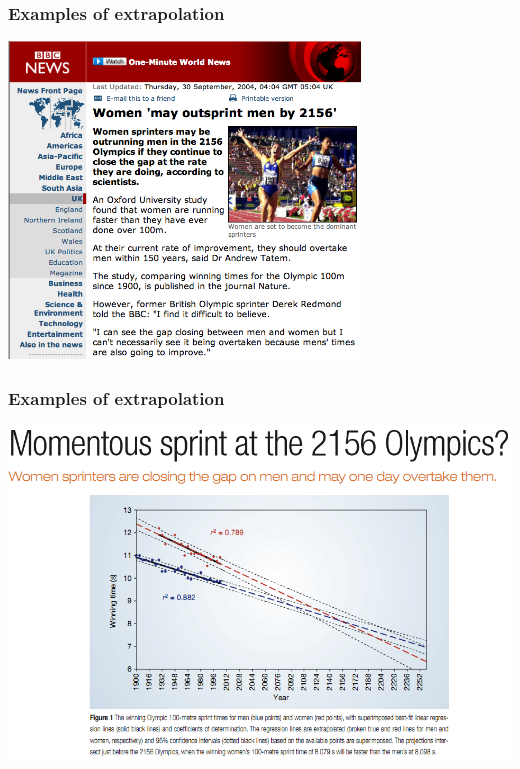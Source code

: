 
\begin{frame}
\frametitle{Examples of extrapolation}

\begin{center}
\includegraphics[width=0.7\textwidth]{8-2_least_square_reg/figures/womenOutsprintBBC}
\end{center}

\end{frame}


\begin{frame}
\frametitle{Examples of extrapolation}

\begin{center}
\includegraphics[width=\textwidth]{8-2_least_square_reg/figures/womenOutsprint}
\end{center}

\end{frame}

